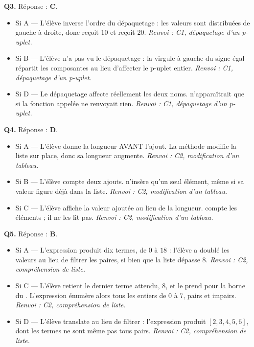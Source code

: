 \textbf{Q3.} Réponse : \textbf{C}.
\begin{itemize}[nosep]
  \item Si A — L'élève inverse l'ordre du dépaquetage : les valeurs sont distribuées de gauche à droite, donc  reçoit $10$ et  reçoit $20$. \emph{Renvoi : C1, dépaquetage d'un p-uplet.}
  \item Si B — L'élève n'a pas vu le dépaquetage : la virgule à gauche du signe égal répartit les composantes au lieu d'affecter le p-uplet entier. \emph{Renvoi : C1, dépaquetage d'un p-uplet.}
  \item Si D — Le dépaquetage affecte réellement les deux noms.  n'apparaîtrait que si la fonction appelée ne renvoyait rien. \emph{Renvoi : C1, dépaquetage d'un p-uplet.}
\end{itemize}

\textbf{Q4.} Réponse : \textbf{D}.
\begin{itemize}[nosep]
  \item Si A — L'élève donne la longueur AVANT l'ajout. La méthode  modifie la liste sur place, donc sa longueur augmente. \emph{Renvoi : C2, modification d'un tableau.}
  \item Si B — L'élève compte deux ajouts.  n'insère qu'un seul élément, même si sa valeur figure déjà dans la liste. \emph{Renvoi : C2, modification d'un tableau.}
  \item Si C — L'élève affiche la valeur ajoutée au lieu de la longueur.  compte les éléments ; il ne les lit pas. \emph{Renvoi : C2, modification d'un tableau.}
\end{itemize}

\textbf{Q5.} Réponse : \textbf{B}.
\begin{itemize}[nosep]
  \item Si A — L'expression produit dix termes, de $0$ à $18$ : l'élève a doublé les valeurs au lieu de filtrer les paires, si bien que la liste dépasse $8$. \emph{Renvoi : C2, compréhension de liste.}
  \item Si C — L'élève retient le dernier terme attendu, $8$, et le prend pour la borne du . L'expression énumère alors tous les entiers de $0$ à $7$, pairs et impairs. \emph{Renvoi : C2, compréhension de liste.}
  \item Si D — L'élève translate au lieu de filtrer : l'expression produit $[2, 3, 4, 5, 6]$, dont les termes ne sont même pas tous pairs. \emph{Renvoi : C2, compréhension de liste.}
\end{itemize}


